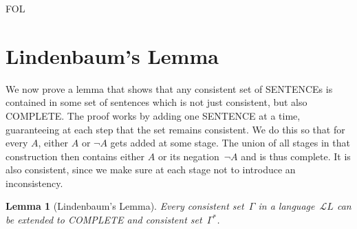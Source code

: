 \documentclass[10pt,a4paper]{article}
\newcommand*{\olup}[1]{\MakeUppercase{#1}}
\theoremstyle{plain}
\newtheorem{lem}[thm]{Lemma}
\theoremstyle{definition}
\theoremstyle{remark}
\newenvironment{explain}{}{}
\newcommand*{\olfileid}[3]{}
\newcommand*{\olsection}[1]{\section*{#1}}
\newcommand*{\ollabel}[1]{\label{#1}}
\providecommand{\Lang}{\ensuremath{\mathcal{L}}}
\providecommand{\iftag}[1]{#1}
\providecommand{\iftag}{}
\begin{document}



\iftag{FOL}
      {\olfileid{fol}{com}{lin}}
      {\olfileid{pl}{com}{lin}}

\olsection{Lindenbaum's Lemma}

\begin{explain}
We now prove a lemma that shows that any consistent set of
\olup{sentence}s is contained in some set of sentences which is not just
consistent, but also \olup{complete}. The proof works by adding one
\olup{sentence} at a time, guaranteeing at each step that the set remains
consistent. We do this so that for every $A$, either $A$ or $\lnot
A$ gets added at some stage. The union of all stages in that
construction then contains either $A$ or its negation~$\lnot A$ and
is thus complete. It is also consistent, since we make sure at each
stage not to introduce an inconsistency.
\end{explain}

\begin{lem}[Lindenbaum's Lemma]
\ollabel{lem:lindenbaum} Every consistent
set~$\Gamma$ in a language~$\Lang{L}$ can be
extended to \olup{complete} and consistent set~$\Gamma^*$.
\end{lem}
\end{document}
